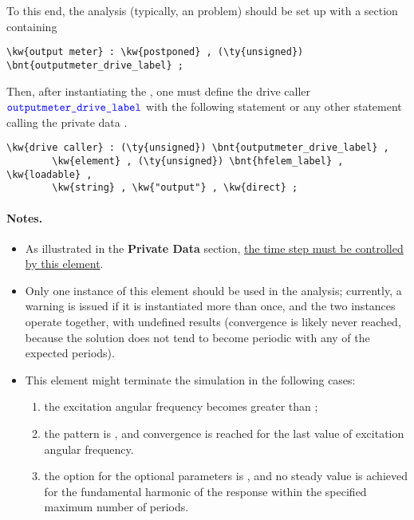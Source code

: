 \begin{itemize}
To this end, the analysis (typically, an  problem) should be set up with a  section containing
\begin{Verbatim}[commandchars=\\\{\}]
    \kw{output meter} : \kw{postponed} , (\ty{unsigned}) \bnt{outputmeter_drive_label} ;
\end{Verbatim}
Then, after instantiating the , one must define the drive caller $\textcolor{blue}{\texttt{outputmeter\_drive\_label}}$ with the following statement or any other statement calling the  private data .
\begin{Verbatim}[commandchars=\\\{\}]
    \kw{drive caller} : (\ty{unsigned}) \bnt{outputmeter_drive_label} ,
        \kw{element} , (\ty{unsigned}) \bnt{hfelem_label} , \kw{loadable} ,
        \kw{string} , \kw{"output"} , \kw{direct} ;
\end{Verbatim}



\end{itemize}

\paragraph{Notes.}
\begin{itemize}
\item As illustrated in the \textbf{Private Data}  section, \underline{the time step must be controlled by this element}.

\item Only one instance of this element should be used in the analysis; currently, a warning is issued if it is instantiated more than once, and the two instances operate together, with undefined results (convergence is likely never reached, because the solution does not tend to become periodic with any of the expected periods).

\item This element might terminate the simulation in the following cases:
\begin{enumerate}[label=\alph*)] %
\item the excitation angular frequency becomes greater than ;
\item the  pattern is , and convergence is reached for the last value of excitation angular frequency.
\item the  option for the  optional parameters is , and no steady value is achieved for the fundamental harmonic of the response within the specified maximum number of periods.
\end{enumerate} %
\end{itemize}

